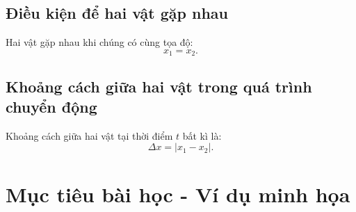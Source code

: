 \subsection{Điều kiện để hai vật gặp nhau}
Hai vật gặp nhau khi chúng có cùng tọa độ:
\begin{equation*}
	x_1=x_2.
\end{equation*}
\subsection{Khoảng cách giữa hai vật trong quá trình chuyển động}
Khoảng cách giữa hai vật tại thời điểm $t$ bất kì là:
\begin{equation*}
	\Delta x=\left|x_1-x_2\right|.
\end{equation*}
\section{Mục tiêu bài học - Ví dụ minh họa}
